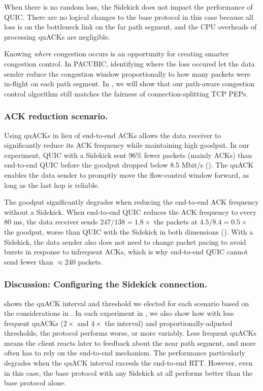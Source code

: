 When there is no random loss, the Sidekick does not impact the performance
of QUIC\@.
There are no logical changes to the base protocol in this case because all loss
is on the
bottleneck link on the far path segment, and the CPU overheads of processing quACKs
are negligible.

Knowing \emph{where} congestion occurs is an opportunity for creating smarter
congestion control. In PACUBIC, identifying where the loss occured let the data
sender reduce the congestion window proportionally to how many packets were
in-flight on each path segment. In , we
will show that our path-aware congestion control algorithm still matches the
fairness of connection-splitting TCP PEPs.

\subsubsection{ACK reduction scenario.}

Using quACKs in lieu of end-to-end ACKs allows the data receiver to
significantly reduce its ACK frequency while maintaining high goodput.
In our experiment, QUIC with a Sidekick sent $96\%$ fewer packets (mainly ACKs)
than end-to-end QUIC before the goodput dropped below 8.5 Mbit/s
().
The quACK enables the data sender to promptly move the flow-control window forward,
as long as the last hop is reliable.

The goodput significantly degrades when reducing the end-to-end ACK frequency
without a Sidekick. When end-to-end QUIC reduces the ACK frequency to every
80 ms, the data receiver sends $247 / 138 = 1.8\times$ the packets at
$4.5 / 8.4 = 0.5\times$ the goodput, worse than QUIC with the Sidekick
in both dimensions (). With a Sidekick,
the data sender also does not need to change packet pacing to avoid bursts in
response to infrequent ACKs, which is why end-to-end QUIC cannot send fewer
than $\approx 240$ packets.

\subsubsection{Discussion: Configuring the Sidekick connection.}
 shows the quACK interval and threshold we
elected for each scenario based on the considerations in
. In each experiment in ,
we also show how with less frequent quACKs ($2\times$ and $4\times$ the
interval) and proportionally-adjusted thresholds, the protocol performs worse,
or more variably. Less frequent quACKs means the client reacts later to
feedback about the near path segment, and more often has to rely on the
end-to-end mechanism. The performance particularly degrades when the quACK
interval exceeds the end-to-end RTT. However, even in this case, the base
protocol with any Sidekick at all performs better than the base protocol alone\@.


